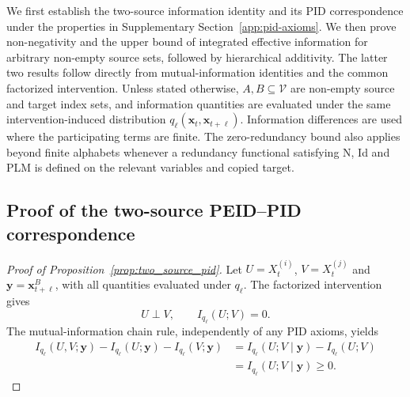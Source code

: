 \documentclass[fleqn,10pt]{wlscirep}
\begin{document}
{\color{red}
We first establish the two-source information identity and its PID correspondence under the properties in Supplementary Section~\ref{app:pid-axioms}. We then prove non-negativity and the upper bound of integrated effective information for arbitrary non-empty source sets, followed by hierarchical additivity. The latter two results follow directly from mutual-information identities and the common factorized intervention. Unless stated otherwise, $A,B\subseteq\mathcal{V}$ are non-empty source and target index sets, and information quantities are evaluated under the same intervention-induced distribution $q_\ell(\boldsymbol{x}_t,\boldsymbol{x}_{t+\ell})$. Information differences are used where the participating terms are finite. The zero-redundancy bound also applies beyond finite alphabets whenever a redundancy functional satisfying N, Id and PLM is defined on the relevant variables and copied target.

\subsection{Proof of the two-source PEID--PID correspondence}
\label{app:proof_two_source_pid}
\begin{proof}[Proof of Proposition~\ref{prop:two_source_pid}]
Let $U=X_t^{(i)}$, $V=X_t^{(j)}$ and $\boldsymbol{y}=\boldsymbol{x}_{t+\ell}^{B}$, with all quantities evaluated under $q_\ell$. The factorized intervention gives
\begin{equation}
U\perp V,\qquad I_{q_\ell}(U;V)=0.
\label{eq:supp_source_independence}
\end{equation}
The mutual-information chain rule, independently of any PID axioms, yields
\begin{align}
I_{q_\ell}(U,V;\boldsymbol{y})-I_{q_\ell}(U;\boldsymbol{y})-I_{q_\ell}(V;\boldsymbol{y})
&=I_{q_\ell}(U;V\mid\boldsymbol{y})-I_{q_\ell}(U;V)\nonumber\\
&=I_{q_\ell}(U;V\mid\boldsymbol{y})\geq0.
\label{eq:supp_two_source_cmi_identity}
\end{align}


\end{proof}}
\end{document}
